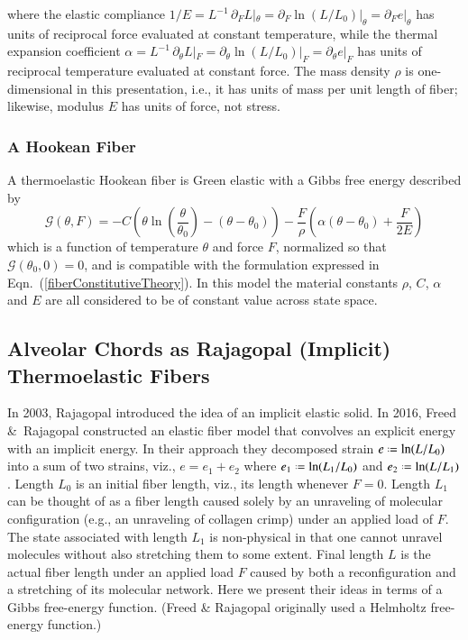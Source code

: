 where the elastic compliance $1/E = L^{-1} \, \partial_F L |_{\theta } = \partial_F \ln (L / L_0) |_{\theta } = \partial_F e |_{\theta }$ has units of reciprocal force evaluated at constant temperature, while the thermal expansion coefficient $\alpha = L^{-1} \, \partial_{\theta} L |_F = \partial_{\theta} \ln (L/L_0) |_F = \partial_{\theta} e |_F$ has units of reciprocal temperature evaluated at constant force.  The mass density $\rho$ is one-dimensional in this presentation, i.e., it has units of mass per unit length of fiber; likewise, modulus $E$ has units of force, not stress.

\subsubsection{A Hookean Fiber}

A thermoelastic Hookean fiber is Green elastic with a Gibbs free energy described by
\begin{equation}
    \mathcal{G} (\theta , F) = -C \left( \theta \ln \left( \frac{\theta}{\theta_0} \right) - 
    (\theta - \theta_0) \right) - 
    \frac{F}{\rho} \left( \alpha ( \theta - \theta_0 ) + \frac{F}{2E} \right)
    \label{GreenEnergy}
\end{equation}
which is a function of temperature $\theta$ and force $F$, normalized so that $\mathcal{G} (\theta_0 , 0) = 0$, and is compatible with the formulation expressed in Eqn.~(\ref{fiberConstitutiveTheory}).  In this model the material constants $\rho$, $C$, $\alpha$ and $E$ are all considered to be of constant value across state space.

\subsection{Alveolar Chords as Rajagopal (Implicit) Thermoelastic Fibers}

In 2003, Rajagopal \cite{Rajagopal03} introduced the idea of an implicit elastic solid.  In 2016, Freed \&\ Rajagopal \cite{FreedRajagopal16} constructed an elastic fiber model that convolves an explicit energy with an implicit energy.  In their approach they decomposed strain $e \defeq \ln (L / L_0)$ into a sum of two strains, viz., $e = e_1 + e_2$ where $e_1 \defeq \ln (L_1 / L_0)$ and $e_2 \defeq \ln (L / L_1)$.  Length $L_0$ is an initial fiber length, viz., its length whenever $F = 0$.  Length $L_1$ can be thought of as a fiber length caused solely by an unraveling of molecular configuration (e.g., an unraveling of collagen crimp) under an applied load of $F$.  The state associated with length $L_1$ is non-physical in that one cannot unravel molecules without also stretching them to some extent.  Final length $L$ is the actual fiber length under an applied load $F$ caused by both a reconfiguration and a stretching of its molecular network.  Here we present their ideas in terms of a Gibbs free-energy function. (Freed \& Rajagopal originally used a Helmholtz free-energy function.)

